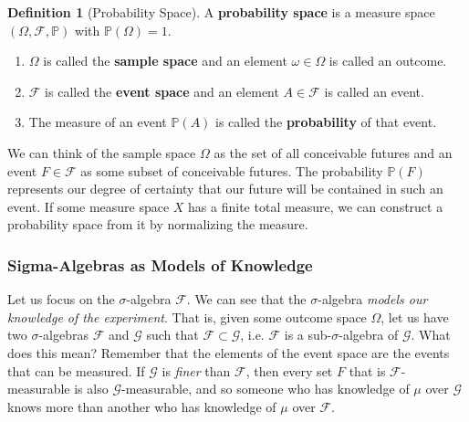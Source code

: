 \documentclass{article}
\theoremstyle{definition}
\theoremstyle{remark}
\theoremstyle{definition}
\newtheorem{definition}{Definition}[section]
\begin{document}
\begin{definition}[Probability Space]
A \textbf{probability space} is a measure space $(\Omega, \mathcal{F}, \mathbb{P})$ with $\mathbb{P}(\Omega) = 1$. 
\begin{enumerate}
    \item $\Omega$ is called the \textbf{sample space} and an element $\omega \in \Omega$ is called an outcome. 
    \item $\mathcal{F}$ is called the \textbf{event space} and an element $A \in \mathcal{F}$ is called an event. 
    \item The measure of an event $\mathbb{P}(A)$ is called the \textbf{probability} of that event. 
\end{enumerate}
We can think of the sample space $\Omega$ as the set of all conceivable futures and an event $F \in \mathcal{F}$ as some subset of conceivable futures. The probability $\mathbb{P}(F)$ represents our degree of certainty that our future will be contained in such an event. If some measure space $X$ has a finite total measure, we can construct a probability space from it by normalizing the measure. 
\end{definition}

\subsubsection{Sigma-Algebras as Models of Knowledge}

Let us focus on the $\sigma$-algebra $\mathcal{F}$. We can see that the $\sigma$-algebra \textit{models our knowledge of the experiment}. That is, given some outcome space $\Omega$, let us have two $\sigma$-algebras $\mathcal{F}$ and $\mathcal{G}$ such that $\mathcal{F} \subset \mathcal{G}$, i.e. $\mathcal{F}$ is a sub-$\sigma$-algebra of $\mathcal{G}$. What does this mean? Remember that the elements of the event space are the events that can be measured. If $\mathcal{G}$ is \textit{finer} than $\mathcal{F}$, then every set $F$ that is $\mathcal{F}$-measurable is also $\mathcal{G}$-measurable, and so someone who has knowledge of $\mu$ over $\mathcal{G}$ knows more than another who has knowledge of $\mu$ over $\mathcal{F}$. 
\end{document}
